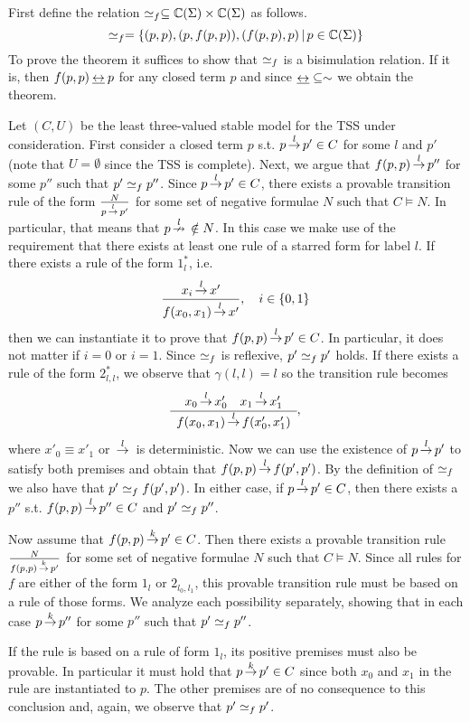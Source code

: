 First define the relation $\mathrel{\simeq_f} \subseteq \mathbb{C}(\Sigma) \times \mathbb{C}(\Sigma)$ as follows.
\[
    \mathrel{\simeq_f} = \{ (p,p), (p,f(p,p)), (f(p,p),p) \,|\, p \in \mathbb{C}(\Sigma) \}
\]
To prove the theorem it suffices to show that $\mathrel{\simeq_f}$ is a bisimulation relation. If it is, then $f(p,p)\mathbin{\mbox{$\underline{\leftrightarrow}$}} p$ for any closed term $p$ and since $\mathbin{\mbox{$\underline{\leftrightarrow}$}} \subseteq \sim$ we obtain the theorem.

Let $(C,U)$ be the least three-valued stable model for the TSS under consideration.
First consider a closed term $p$ s.t. $p \,{\stackrel{{l}}{\rightarrow}}\, p' \in C$ for some $l$ and $p'$ (note that $U=\emptyset$ since the TSS is complete).
Next, we argue that $f(p,p) \,{\stackrel{{l}}{\rightarrow}}\, p''$ for some $p''$ such that  $p' \mathrel{\simeq_f} p''$.
Since $p \,{\stackrel{{l}}{\rightarrow}}\, p' \in C$, there exists a provable transition rule of the form $\frac{N}{p \,{\stackrel{{l}}{\rightarrow}}\, p'}$ for some set of negative formulae $N$ such that $C \vDash N$.
In particular, that means that $p \,{\stackrel{{l}}{\nrightarrow}}\, \notin N$.
In this case we make use of the requirement that there exists at least one rule of a starred form for label $l$. If there exists a
rule of the form $1_l^*$, i.e.
\[
    \sosrule[i\in\{0,1\}]{x_i\trans{l}x'}{f(x_0,x_1)\trans{l}x'}
\]
then we can instantiate it to prove that $f(p,p)\,{\stackrel{{l}}{\rightarrow}}\,p'\in C$.
In particular, it does not matter if $i=0$ or $i=1$.
Since $\mathrel{\simeq_f}$ is reflexive, $p'\mathrel{\simeq_f} p'$ holds.
If there exists a rule of the form $2_{l,l}^*$, we observe that $\gamma(l,l) = l$ so the transition rule becomes
\[
    \sosrule{x_0\trans{l}x_0' \quad x_1\trans{l}x_1'}{f(x_0,x_1) \trans{l} f(x_0',x_1')},
\]
where $x'_0 \equiv x'_1$ or $\,{\stackrel{{l}}{\rightarrow}}\,$ is deterministic.
Now we can use the existence of $p\,{\stackrel{{l}}{\rightarrow}}\,p'$ to satisfy both premises and obtain that $f(p,p)\,{\stackrel{{l}}{\rightarrow}}\,f(p',p')$.
By the definition of $\mathrel{\simeq_f}$ we also have that $p' \mathrel{\simeq_f} f(p',p')$.
In either case, if $p \,{\stackrel{{l}}{\rightarrow}}\, p'\in C$, then there exists a $p''$ s.t. $f(p,p) \,{\stackrel{{l}}{\rightarrow}}\, p'' \in C$ and $p' \mathrel{\simeq_f} p''$.

Now assume that $f(p,p) \,{\stackrel{{k}}{\rightarrow}}\, p' \in C$. Then there exists a provable transition rule $\frac{N}{f(p,p) \,{\stackrel{{k}}{\rightarrow}}\, p'}$
for some set of negative formulae $N$ such that $C\vDash N$. Since all rules for $f$ are either of the form $1_l$ or $2_{l_0,l_1}$,
this provable transition rule must be based on a rule of those forms. We analyze each possibility separately, showing that
in each case $p \,{\stackrel{{k}}{\rightarrow}}\, p''$ for some $p''$ such that $p' \mathrel{\simeq_f} p''$.

If the rule is based on a rule of form $1_l$, its positive premises must also be provable. In particular it must hold that
$p\,{\stackrel{{k}}{\rightarrow}}\, p' \in C$ since both $x_0$ and $x_1$ in the rule are instantiated to $p$. The other premises are of no
consequence to this conclusion and, again, we observe that $p'\mathrel{\simeq_f} p'$.

